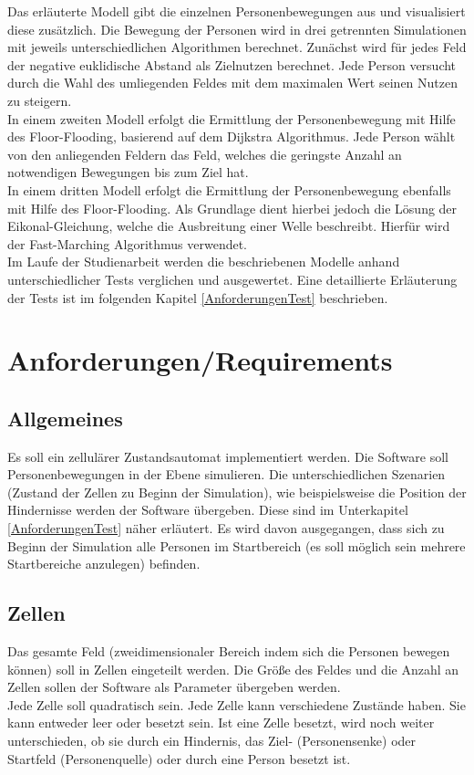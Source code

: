 Das erläuterte Modell gibt die einzelnen Personenbewegungen aus und visualisiert diese zusätzlich. Die Bewegung der Personen wird in drei getrennten Simulationen mit jeweils unterschiedlichen Algorithmen berechnet. Zunächst wird für jedes Feld der negative euklidische Abstand als Zielnutzen berechnet. Jede Person versucht durch die Wahl des umliegenden Feldes mit dem maximalen Wert seinen Nutzen zu steigern. \\
In einem zweiten Modell erfolgt die Ermittlung der Personenbewegung mit Hilfe des Floor-Flooding, basierend auf dem Dijkstra Algorithmus. Jede Person wählt von den anliegenden Feldern das Feld, welches die geringste Anzahl an notwendigen Bewegungen bis zum Ziel hat. \\
In einem dritten Modell erfolgt die Ermittlung der Personenbewegung ebenfalls mit Hilfe des Floor-Flooding. Als Grundlage dient hierbei jedoch die Lösung der Eikonal-Gleichung, welche die Ausbreitung einer Welle beschreibt. Hierfür wird der Fast-Marching Algorithmus verwendet.  \\
Im Laufe der Studienarbeit werden die beschriebenen Modelle anhand unterschiedlicher Tests verglichen und ausgewertet. Eine detaillierte Erläuterung der Tests ist im folgenden Kapitel \ref{AnforderungenTest} beschrieben.


\section{Anforderungen/Requirements}
\label{requirements}

\subsection{Allgemeines}
Es soll ein zellulärer Zustandsautomat implementiert werden. Die Software soll Personenbewegungen in der Ebene simulieren. Die unterschiedlichen Szenarien (Zustand der Zellen zu Beginn der Simulation), wie beispielsweise die Position der Hindernisse werden der Software übergeben. Diese sind im Unterkapitel \ref{AnforderungenTest} näher erläutert. Es wird davon ausgegangen, dass sich zu Beginn der Simulation alle Personen im Startbereich (es soll möglich sein mehrere Startbereiche anzulegen) befinden.

\subsection{Zellen}
Das gesamte Feld (zweidimensionaler Bereich indem sich die Personen bewegen können) soll in Zellen eingeteilt werden. Die Größe des Feldes und die Anzahl an Zellen sollen der Software als Parameter übergeben werden.\\
Jede Zelle soll quadratisch sein. Jede Zelle kann verschiedene Zustände haben. Sie kann entweder leer oder besetzt sein. Ist eine Zelle besetzt, wird noch weiter unterschieden, ob sie durch ein Hindernis, das Ziel- (Personensenke) oder Startfeld (Personenquelle) oder durch eine Person besetzt ist.


